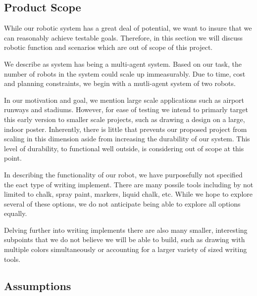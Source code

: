 \subsection{Product Scope}
\label{sec:project_scope}
While our robotic system has a great deal of potential, we want to insure that we can reasonably achieve testable goals. Therefore, in this section we will discuss robotic function and scenarios which are out of scope of this project. 

We describe as system has being a multi-agent system. Based on our task, the number of robots in the system could scale up immeasurably. Due to time, cost and planning constraints, we begin with a mutli-agent system of two robots. 

In our motivation and goal, we mention large scale applications such as airport runways and stadiums. However, for ease of testing we intend to primarly target this early version to smaller scale projects, such as drawing a design on a large, indoor poster. Inherently, there is little that prevents our proposed project from scaling in this dimension aside from increasing the durability of our system. This level of durability, to functional well outside, is considering out of scope at this point. 

In describing the functionality of our robot, we have purposefully not specified the eact type of writing implement. There are many possile tools including by not limited to chalk, spray paint, markers, liquid chalk, etc. While we hope to explore several of these options, we do not anticipate being able to explore all options equally. 

Delving further into writing implements there are also many smaller, interesting subpoints that we do not believe we will be able to build, such as drawing with multiple colors simultaneously or accounting for a larger variety of sized writing tools. 

\subsection{Assumptions}
\label{sec:assumptions}

